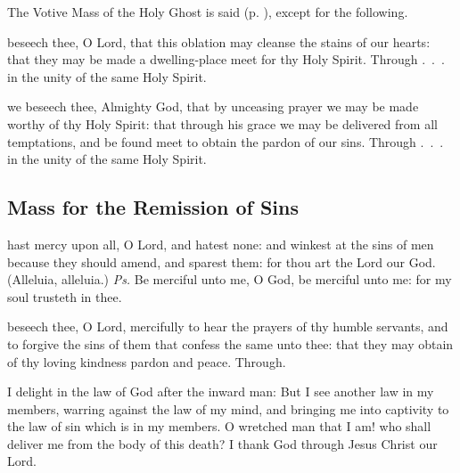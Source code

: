 \begin{rubric}
	The Votive Mass of the Holy Ghost is said (p. \pageref{VotiveHolyGhost}), except for the following.
\end{rubric}


\secret
{} beseech thee, O Lord, that this oblation may cleanse the stains of our hearts: that they may be made a dwelling-place meet for thy Holy Spirit. Through .~.~. in the unity of the same Holy Spirit.

\postcommunion
{} we beseech thee, Almighty God, that by unceasing prayer we may be made worthy of thy Holy Spirit: that through his grace we may be delivered from all temptations, and be found meet to obtain the pardon of our sins. Through .~.~. in the unity of the same Holy Spirit.


\subsection{Mass for the Remission of Sins}

\introit
{} hast mercy upon all, O Lord, and hatest none: and winkest at the sins of men because they should amend, and sparest them: for thou art the Lord our God. (Alleluia, alleluia.) \textit{Ps.} Be merciful unto me, O God, be merciful unto me: for my soul trusteth in thee.

\collect
{} beseech thee, O Lord, mercifully to hear the prayers of thy humble servants, and to forgive the sins of them that confess the same unto thee: that they may obtain of thy loving kindness pardon and peace. Through.

 I delight in the law of God after the inward man: But I see another law in my members, warring against the law of my mind, and bringing me into captivity to the law of sin which is in my members. O wretched man that I am! who shall deliver me from the body of this death? I thank God through Jesus Christ our Lord.


